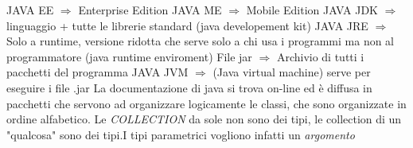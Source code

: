 JAVA EE $\Rightarrow$ Enterprise Edition \newline
JAVA ME $\Rightarrow$ Mobile Edition \newline
JAVA JDK $\Rightarrow$ linguaggio + tutte le librerie standard (java developement kit) \newline
JAVA JRE $\Rightarrow$ Solo a runtime, versione ridotta che serve solo a chi usa i programmi ma non al programmatore (java runtime enviroment) \newline
File jar  $\Rightarrow$ Archivio di tutti i pacchetti del programma \newline
JAVA JVM $\Rightarrow$ (Java virtual machine) serve per eseguire i file .jar \newline
La documentazione di java si trova on-line ed è diffusa in pacchetti che servono ad organizzare logicamente le classi, che sono organizzate in ordine alfabetico. \newline
Le \textit{COLLECTION} da sole non sono dei tipi, le collection di un "qualcosa" sono dei tipi.I tipi parametrici vogliono infatti un \textit{argomento}




\newpage











